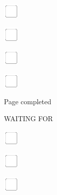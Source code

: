 \documentclass[11pt,titlepage]{article}
\begin{document}
\vspace{10mm}

\noindent
\includegraphics[]{checkbox-4mm.pdf}

\vspace{10mm}

\noindent
\includegraphics[]{checkbox-4mm.pdf}

\vspace{10mm}

\noindent
\includegraphics[]{checkbox-4mm.pdf}

\vspace{10mm}

\noindent
\includegraphics[]{checkbox-4mm.pdf}

\vspace{4mm}

\hfill Page completed \hspace{20mm}

\pagebreak

\small
\hfill WAITING FOR

\vspace{6mm}

\noindent
\includegraphics[]{checkbox-4mm.pdf}

\vspace{10mm}

\noindent
\includegraphics[]{checkbox-4mm.pdf}

\vspace{10mm}

\noindent
\includegraphics[]{checkbox-4mm.pdf}
\end{document}
